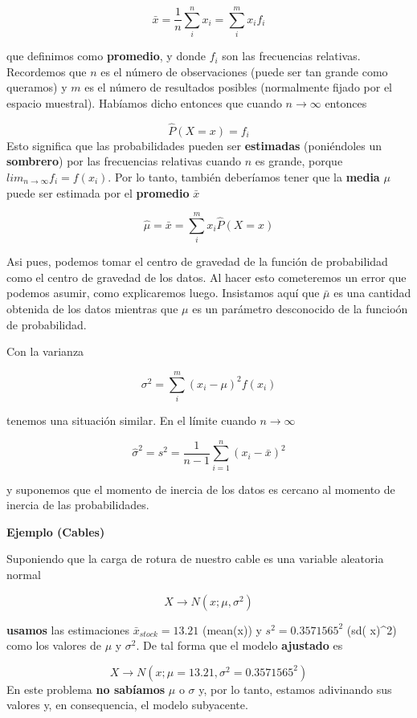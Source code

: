 \documentclass[
]{book}
\begin{document}
\[\bar{x}= \frac{1}{n} \sum_{i}^n x_i = \sum_{i}^m x_if_i\]

que definimos como \textbf{promedio}, y donde \(f_i\) son las frecuencias relativas. Recordemos que \(n\) es el número de observaciones (puede ser tan grande como queramos) y \(m\) es el número de resultados posibles (normalmente fijado por el espacio muestral). Habíamos dicho entonces que cuando \(n \rightarrow \infty\) entonces

\[\hat{P}(X=x)=f_i\]
Esto significa que las probabilidades pueden ser \textbf{estimadas} (poniéndoles un \textbf{sombrero}) por las frecuencias relativas cuando \(n\) es grande, porque \(lim_{n\rightarrow \infty}f_i=f(x_i)\). Por lo tanto, también deberíamos tener que la \textbf{media} \(\mu\) puede ser estimada por el \textbf{promedio} \(\bar{x}\)

\[\hat{\mu}=\bar{x}= \sum_{i}^m x_i\hat{P}(X=x)\]

Asi pues, podemos tomar el centro de gravedad de la función de probabilidad como el centro de gravedad de los datos. Al hacer esto cometeremos un error que podemos asumir, como explicaremos luego. Insistamos aquí que \(\bar{\mu}\) es una cantidad obtenida de los datos mientras que \(\mu\) es un parámetro desconocido de la funcioón de probabilidad.

Con la varianza

\[\sigma^2=\sum_{i}^m (x_i-\mu)^2f(x_i)\]

tenemos una situación similar. En el límite cuando \(n \rightarrow \infty\)

\[\hat{\sigma}^2=s^2=\frac{1}{n-1}\sum_{i=1}^n (x_i-\bar{x})^2\]

y suponemos que el momento de inercia de los datos es cercano al momento de inercia de las probabilidades.

\textbf{Ejemplo (Cables)}

Suponiendo que la carga de rotura de nuestro cable es una variable aleatoria normal

\[X \rightarrow N(x; \mu, \sigma^2)\]

\textbf{usamos} las estimaciones \(\bar{x}_{stock}=13.21\) (mean(x)) y \(s^2=0.3571565^2\) (sd( x)\^{}2) como los valores de \(\mu\) y \(\sigma^2\). De tal forma que el modelo \textbf{ajustado} es

\[X \rightarrow N(x; \mu=13.21, \sigma^2=0.3571565^2)\]
En este problema \textbf{no sabíamos} \(\mu\) o \(\sigma\) y, por lo tanto, estamos adivinando sus valores y, en consequencia, el modelo subyacente.
\end{document}
